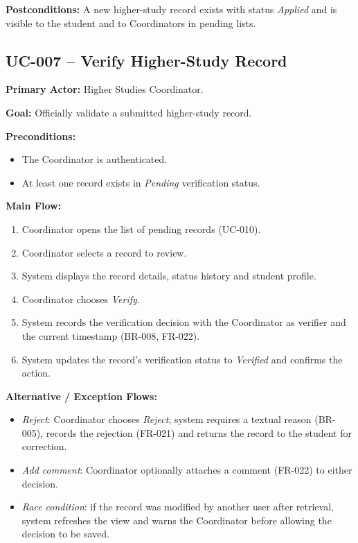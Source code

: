 \documentclass[11pt,a4paper]{article}
\begin{document}
\medskip

\noindent\textbf{Postconditions:} A new higher-study record exists with status \emph{Applied} and is visible to the student and to Coordinators in pending lists.

\subsection{UC-007 -- Verify Higher-Study Record}

\noindent\textbf{Primary Actor:} Higher Studies Coordinator.

\medskip

\noindent\textbf{Goal:} Officially validate a submitted higher-study record.

\medskip

\noindent\textbf{Preconditions:}
\begin{itemize}
  \item The Coordinator is authenticated.
  \item At least one record exists in \emph{Pending} verification status.
\end{itemize}

\medskip

\noindent\textbf{Main Flow:}
\begin{enumerate}
  \item Coordinator opens the list of pending records (UC-010).
  \item Coordinator selects a record to review.
  \item System displays the record details, status history and student profile.
  \item Coordinator chooses \emph{Verify}.
  \item System records the verification decision with the Coordinator as verifier and the current timestamp (BR-008, FR-022).
  \item System updates the record's verification status to \emph{Verified} and confirms the action.
\end{enumerate}

\medskip

\noindent\textbf{Alternative / Exception Flows:}
\begin{itemize}
  \item \emph{Reject}: Coordinator chooses \emph{Reject}; system requires a textual reason (BR-005), records the rejection (FR-021) and returns the record to the student for correction.
  \item \emph{Add comment}: Coordinator optionally attaches a comment (FR-022) to either decision.
  \item \emph{Race condition}: if the record was modified by another user after retrieval, system refreshes the view and warns the Coordinator before allowing the decision to be saved.
\end{itemize}
\end{document}
